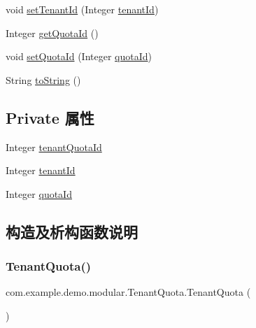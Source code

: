 \begin{DoxyCompactItemize}
void \mbox{\hyperlink{classcom_1_1example_1_1demo_1_1modular_1_1_tenant_quota_a5c98d57b70f27584c5efd3cb662d6860}{set\+Tenant\+Id}} (Integer \mbox{\hyperlink{classcom_1_1example_1_1demo_1_1modular_1_1_tenant_quota_a2a36a0f31f76f7907d0f0c56ebc01f9d}{tenant\+Id}})
\item 
Integer \mbox{\hyperlink{classcom_1_1example_1_1demo_1_1modular_1_1_tenant_quota_a1ec91698f206beb3f1afa502caea9124}{get\+Quota\+Id}} ()
\item 
void \mbox{\hyperlink{classcom_1_1example_1_1demo_1_1modular_1_1_tenant_quota_a19cf043f8c2e14a23aca2ca2809298d0}{set\+Quota\+Id}} (Integer \mbox{\hyperlink{classcom_1_1example_1_1demo_1_1modular_1_1_tenant_quota_a7e5032daf54dc992fdfdd992aa631bd5}{quota\+Id}})
\item 
String \mbox{\hyperlink{classcom_1_1example_1_1demo_1_1modular_1_1_tenant_quota_aea8bca87ab45ec9d2f17567ee1ef057d}{to\+String}} ()
\end{DoxyCompactItemize}
\subsection*{Private 属性}
\begin{DoxyCompactItemize}
\item 
Integer \mbox{\hyperlink{classcom_1_1example_1_1demo_1_1modular_1_1_tenant_quota_aea2751cc734fab6627496734fada822b}{tenant\+Quota\+Id}}
\item 
Integer \mbox{\hyperlink{classcom_1_1example_1_1demo_1_1modular_1_1_tenant_quota_a2a36a0f31f76f7907d0f0c56ebc01f9d}{tenant\+Id}}
\item 
Integer \mbox{\hyperlink{classcom_1_1example_1_1demo_1_1modular_1_1_tenant_quota_a7e5032daf54dc992fdfdd992aa631bd5}{quota\+Id}}
\end{DoxyCompactItemize}


\subsection{构造及析构函数说明}
\mbox{\label{classcom_1_1example_1_1demo_1_1modular_1_1_tenant_quota_a0b5a828ee24c432901a23f28cbda3989}} 
\subsubsection{\texorpdfstring{Tenant\+Quota()}{TenantQuota()}\hspace{0.1cm}{\footnotesize\ttfamily [1/3]}}
{\footnotesize\ttfamily com.\+example.\+demo.\+modular.\+Tenant\+Quota.\+Tenant\+Quota (\begin{DoxyParamCaption}{ }\end{DoxyParamCaption})}

